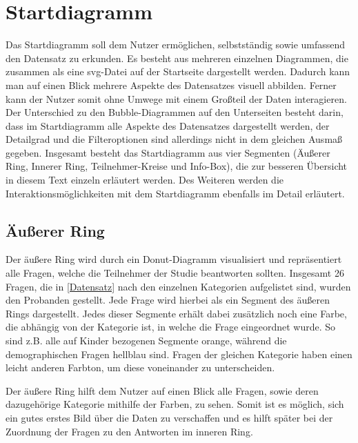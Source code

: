 \documentclass{mi-seminar}
\begin{document}
\section{Startdiagramm}
Das Startdiagramm soll dem Nutzer ermöglichen, selbstständig sowie umfassend den Datensatz zu erkunden. Es besteht aus mehreren einzelnen Diagrammen, die zusammen als eine svg-Datei auf der Startseite dargestellt werden. Dadurch kann man auf einen Blick mehrere Aspekte des Datensatzes visuell abbilden. Ferner kann der Nutzer somit ohne Umwege mit einem Großteil der Daten interagieren. Der Unterschied zu den Bubble-Diagrammen auf den Unterseiten besteht darin, dass im Startdiagramm alle Aspekte des Datensatzes dargestellt werden, der Detailgrad und die Filteroptionen sind allerdings nicht in dem gleichen Ausmaß gegeben. Insgesamt besteht das Startdiagramm aus vier Segmenten (Äußerer Ring, Innerer Ring, Teilnehmer-Kreise und Info-Box), die zur besseren Übersicht in diesem Text einzeln erläutert werden. Des Weiteren werden die Interaktionsmöglichkeiten  mit dem Startdiagramm ebenfalls im Detail erläutert.

\subsection{Äußerer Ring}
Der äußere Ring wird durch ein Donut-Diagramm visualisiert und repräsentiert alle Fragen, welche die Teilnehmer der Studie beantworten sollten. Insgesamt 26 Fragen, die in \ref{Datensatz} nach den einzelnen Kategorien aufgelistet sind, wurden den Probanden gestellt. Jede Frage wird hierbei als ein Segment des äußeren Rings dargestellt. Jedes dieser Segmente erhält dabei zusätzlich noch eine Farbe, die abhängig von der Kategorie ist, in welche die Frage eingeordnet wurde. So sind z.B. alle auf Kinder bezogenen Segmente orange, während die demographischen Fragen hellblau sind. Fragen der gleichen Kategorie haben einen leicht anderen Farbton, um diese voneinander zu unterscheiden. 

Der äußere Ring hilft dem Nutzer auf einen Blick alle Fragen, sowie deren dazugehörige Kategorie mithilfe der Farben, zu sehen. Somit ist es möglich, sich ein gutes erstes Bild über die Daten zu verschaffen und es hilft später bei der Zuordnung der Fragen zu den Antworten im inneren Ring. 
\end{document}
